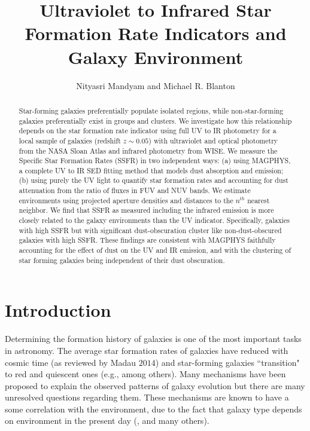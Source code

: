 \documentclass[iop]{emulateapj}
\begin{document}
\title{Ultraviolet to Infrared Star Formation Rate Indicators and Galaxy Environment}
\author{Nityasri Mandyam and Michael R. Blanton}
\begin{abstract}
Star-forming galaxies preferentially populate isolated regions, while 
non-star-forming galaxies preferentially exist in groups and clusters. 
We investigate how this relationship depends on the star formation 
rate indicator using full UV to IR photometry for a local sample 
of galaxies (redshift $z \sim 0.05$) with ultraviolet and optical 
photometry from the NASA Sloan Atlas and infrared photometry 
from WISE. We measure the Specific Star Formation Rates (SSFR) 
in two independent ways: (a) using MAGPHYS, a complete UV to IR 
SED fitting method that models dust absorption and emission; (b) 
using purely the UV light to quantify star formation rates and 
accounting for dust attenuation from the ratio of fluxes in FUV 
and NUV bands. We estimate environments using projected 
aperture densities and distances to the $n^{th}$ nearest 
neighbor. We find that SSFR as measured including the infrared 
emission is more closely related to the galaxy environments 
than the UV indicator. Specifically, galaxies with high SSFR
but with significant dust-obscuration  cluster like 
non-dust-obscured galaxies with high SSFR. These findings are 
consistent with MAGPHYS faithfully accounting for the effect of
dust on the UV and IR emission, and with the clustering of star
forming galaxies being independent of their dust obscuration.
\end{abstract}
\keywords{}
\section{Introduction}

Determining the formation history of galaxies is one of the most important 
tasks in astronomy. The average star formation rates of galaxies 
have reduced with cosmic time (as reviewed by Madau $2014$) and
star-forming galaxies ``transition" to red and quiescent ones (e.g., 
\cite{ilbert_mass_2013, muzzin_evolution_2013, moustakas_primus:_2013, tomczak_galaxy_2014} among others).
Many mechanisms have been proposed to explain the observed patterns of 
galaxy  evolution but there are many unresolved questions regarding them. 
These mechanisms are known to have a some correlation with the environment, 
due to the fact that galaxy type depends on environment in the present day
(\citealt{hubble36a, dressler80a}, and many others).
\end{document}
